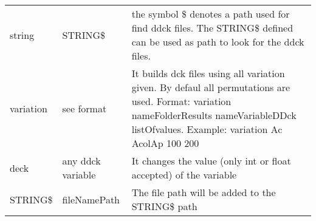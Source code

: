 \documentclass[english]{SPFReport}
\begin{document}
\begin{tabular}{| p{15mm} |  p{35mm} | p{100mm}  |}
  string & STRING\$ & the symbol \$ denotes a path used for find ddck files. The STRING\$ defined can be used as path to look for the ddck files.\\
  variation & see format& It builds dck files using all variation given.  By defaul all permutations are used. Format: variation nameFolderResults nameVariableDDck listOfvalues. Example:   variation Ac AcolAp 100 200\\
    deck & any ddck variable & It changes the value (only int or float accepted) of the variable \\
   STRING\$ & fileNamePath & The file path will be added to the STRING\$ path \\   
\hline
\end{tabular}
\end{document}
